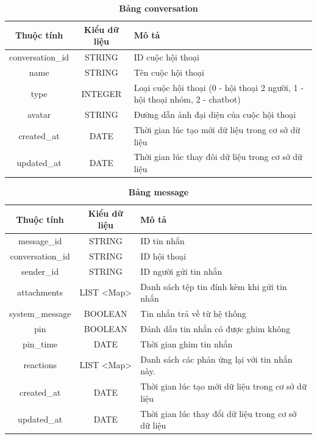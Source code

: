 \begin{table}[H]
  \caption{\bfseries \fontsize{12pt}{0pt}\selectfont Bảng conversation}
  \centering
  \begin{tabularx}{0.9\textwidth}{|c|c|X|}
    \hline
    \textbf{Thuộc tính} & \textbf{Kiểu dữ liệu} & \textbf{Mô tả} \\
    \hline
    conversation\_id & STRING & ID cuộc hội thoại  \\
    \hline
    name & STRING & Tên cuộc hội thoại \\
    \hline
    type & INTEGER & Loại cuộc hội thoại (0 - hội thoại 2 người, 1 - hội thoại nhóm, 2 - chatbot) \\
    \hline
    avatar & STRING & Đường dẫn ảnh đại diện của cuộc hội thoại  \\
    \hline
    created\_at & DATE & Thời gian lúc tạo mới dữ liệu trong cơ sở dữ liệu \\
    \hline
    updated\_at & DATE & Thời gian lúc thay đôi dữ liệu trong cơ sở dữ liệu \\
    \hline
  \end{tabularx}
\end{table}

\begin{table}[H]
  \caption{\bfseries \fontsize{12pt}{0pt}\selectfont Bảng message}
  \centering
  \begin{tabularx}{0.9\textwidth}{|c|c|X|}
    \hline
    \textbf{Thuộc tính} & \textbf{Kiểu dữ liệu} & \textbf{Mô tả} \\
    \hline
    message\_id & STRING & ID tin nhắn  \\
    \hline
    conversation\_id & STRING & ID hội thoại  \\
    \hline
    sender\_id & STRING & ID người gửi tin nhắn  \\
    \hline
    attachments & LIST <Map> & Danh sách tệp tin đính kèm khi gửi tin nhắn\\
    \hline
    system\_message & BOOLEAN & Tin nhắn trả về từ hệ thống\\
    \hline
    pin & BOOLEAN & Đánh dấu tin nhắn có được ghim không\\
    \hline
    pin\_time & DATE & Thời gian ghim tin nhắn\\
    \hline
    reactions & LIST <Map> & Danh sách các phản ứng lại với tin nhắn này.\\
    \hline
    created\_at & DATE & Thời gian lúc tạo mới dữ liệu trong cơ sở dữ liệu \\
    \hline
    updated\_at & DATE & Thời gian lúc thay đổi dữ liệu trong cơ sở dữ liệu \\
    \hline
  \end{tabularx}
\end{table}

